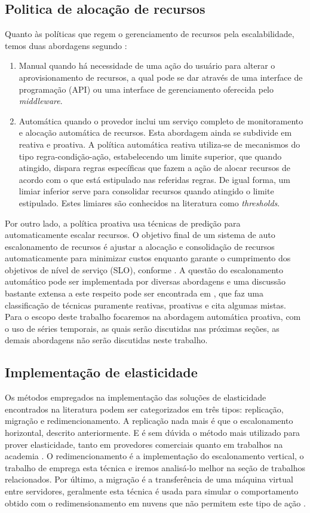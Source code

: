 \documentclass[twoside,english,brazilian]{UNISINOSmonografia}
\begin{document}
\subsection{Politica de alocação de recursos}
Quanto às políticas que regem o gerenciamento de recursos pela escalabilidade, temos duas abordagens segundo \cite{Galante2012}:

\begin{enumerate}
	\item Manual quando há necessidade de uma ação do usuário para alterar o aprovisionamento de recursos, a qual pode se dar através de uma interface de programação (API) ou uma interface de gerenciamento oferecida pelo \textit{middleware}.
	\item Automática quando o provedor inclui um serviço completo de monitoramento e alocação automática de recursos. Esta abordagem ainda se subdivide em reativa e proativa.
	A política automática reativa utiliza-se de mecanismos do tipo regra-condição-ação, estabelecendo um limite superior, que quando atingido, dispara regras específicas que fazem a ação de alocar recursos de acordo com o que está estipulado nas referidas regras. De igual forma, um limiar inferior serve para consolidar recursos quando atingido o limite estipulado. Estes limiares são conhecidos na literatura como \textit{thresholds}.
\end{enumerate}	
	Por outro lado, a política proativa usa técnicas de predição para automaticamente escalar recursos. O objetivo final de um sistema de auto escalonamento de recursos é ajustar a alocação e consolidação de recursos automaticamente para minimizar custos enquanto garante o cumprimento dos objetivos de nível de serviço (SLO), conforme \cite{Lorido-botr2012}.
	A questão do escalonamento automático pode ser implementada por diversas abordagens e uma discussão bastante extensa a este respeito pode ser encontrada em \cite{Lorido-botr2012}, que faz uma classificação de técnicas puramente reativas, proativas e cita algumas mistas. 	Para o escopo deste trabalho focaremos na abordagem automática proativa, com o uso de séries temporais, as quais serão discutidas nas próximas seções, as demais abordagens não serão discutidas neste trabalho.

\subsection{Implementação de elasticidade}
Os métodos empregados na implementação das soluções de elasticidade encontrados na literatura podem ser categorizados em três tipos: replicação, migração e redimencionamento. A replicação nada mais é que o escalonamento horizontal, descrito anteriormente. E é sem dúvida o método mais utilizado para prover elasticidade, tanto em provedores comerciais quanto em trabalhos na academia \cite{Galante2012}. O redimencionamento é a implementação do escalonamento vertical, o trabalho de \cite{Wilkes2010} emprega esta técnica e iremos analisá-lo melhor na seção de trabalhos relacionados. Por último, a migração é a transferência de uma máquina virtual entre servidores, geralmente esta técnica é usada para simular o comportamento obtido com o redimensionamento em nuvens que não permitem este tipo de ação \cite{Galante2012}.
\end{document}
